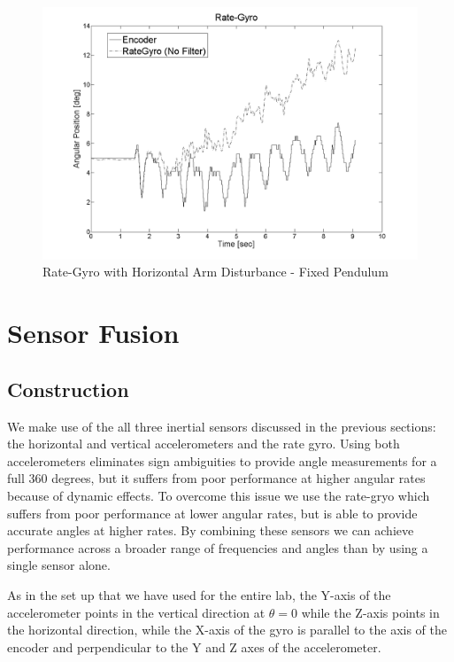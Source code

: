 \documentclass{article}
\theoremstyle{plain}
\theoremstyle{definition}
\theoremstyle{remark}
\begin{document}
\begin{figure}[hbt]
\begin{center}
\includegraphics[width = 13cm]{Gyro_PendulumFixed_Dist.png}
\caption{Rate-Gyro with Horizontal Arm Disturbance - Fixed Pendulum}
\label{Gyro_PendulumFixed_Dist}
\end{center}
\end{figure}

\clearpage
\section{Sensor Fusion}

\subsection{Construction}
We make use of the all three inertial sensors discussed in the previous sections: the horizontal and vertical accelerometers and the rate gyro.  Using both accelerometers eliminates sign ambiguities to provide angle measurements for a full 360 degrees, but it suffers from poor performance at higher angular rates because of dynamic effects.  To overcome this issue we use the rate-gryo which suffers from poor performance at lower angular rates, but is able to provide accurate angles at higher rates.  By combining these sensors we can achieve performance across a broader range of frequencies and angles than by using a single sensor alone.  

As in the set up that we have used for the entire lab, the Y-axis of the accelerometer points in the vertical direction at $\theta = 0$ while the Z-axis points in the horizontal direction, while the X-axis of the gyro is parallel to the axis of the encoder and perpendicular to the Y and Z axes of the accelerometer.  
\end{document}
